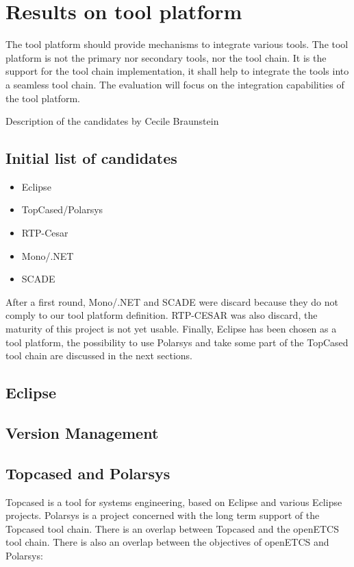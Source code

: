 
\chapter{Results on tool platform}
The tool platform should provide mechanisms to integrate various
tools. The tool platform is not the primary nor secondary tools, nor
the tool chain. It is the support for the tool chain implementation,
it shall help to integrate the tools into a seamless tool chain.
The evaluation will focus on the integration capabilities of the tool platform.
\begin{todo_comment}
Description of the candidates by Cecile Braunstein
\end{todo_comment}

\section{Initial list of candidates}
\begin{itemize}
\item  Eclipse 
\item  TopCased/Polarsys
\item RTP-Cesar
\item Mono/.NET 
\item SCADE
\end{itemize}

After a first round, Mono/.NET and  SCADE were discard because they do
not comply to our tool platform definition.
RTP-CESAR was also discard, the maturity of this project is not yet
usable. Finally, Eclipse has been chosen as a tool platform, the possibility
to use Polarsys and take some part of the TopCased tool chain are
discussed in the next sections.



\section{Eclipse}

\section{Version Management}

\section{Topcased and Polarsys}

Topcased is a tool for systems engineering, based on Eclipse and various Eclipse projects.  Polarsys is a project concerned with the long term support of the Topcased tool chain.  There is an overlap between Topcased and the openETCS tool chain.  There is also an overlap between the objectives of openETCS and Polarsys:

